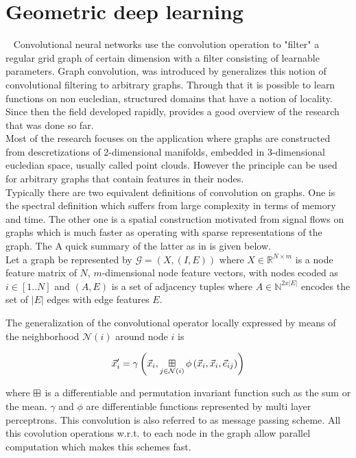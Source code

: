 \section{Geometric deep learning}~\label{sec:gcn}
Convolutional neural networks use the convolution operation to "filter" a regular grid graph of certain dimension with a filter consisting of learnable parameters. Graph convolution, was introduced by \cite{bruna2013spectral} generalizes this notion of convolutional filtering to arbitrary graphs. Through that it is possible to learn functions on non eucledian, structured domains that have a notion of locality.\\
Since then the field developed rapidly, \cite{Bronstein_2017} provides a good overview of the research that was done so far.\\
Most of the research focuses on the application where graphs are constructed from descretizations of 2-dimensional manifolds, embedded in 3-dimensional eucledian space, usually called point clouds. However the principle can be used for arbitrary graphs that contain features in their nodes.\\
Typically there are two equivalent definitions of convolution on graphs. One is the spectral definition which suffers from large complexity in terms of memory and time. The other one is a spatial construction motivated from signal flows on graphs which is much faster as operating with sparse representations of the graph. The A quick summary of the latter as in \cite{gilmer2017neural} is given below. \\

Let a graph be represented by $\mathcal{G}=(X, (I, E))$ where $X\in \mathbb{R}^{N\times m}$ is a node feature matrix of $N$, $m$-dimensional node feature vectors, with nodes ecoded as $i \in[1..N]$ and $(A, E)$ is a set of adjacency tuples where $A\in \mathbb{N}^{2x|E|}$ encodes the set of $|E|$ edges with edge features $E$.

The generalization of the convolutional operator locally expressed by means of the neighborhood $\mathcal{N}(i)$ around node $i$ is

\begin{align}
	\vec{x}_i^\prime = \gamma \left(\vec{x}_i, \operatorname*{\boxplus}_{j \in \mathcal{N}(i)}  \phi \left(\vec{x}_i, \vec{x}_i, \vec{e}_{ij} \right) \right)
\end{align}

where $\operatorname*{\boxplus}$ is a differentiable and permutation invariant function such as the sum or the mean. $\gamma$ and $\phi$ are differentiable functions represented by multi layer perceptrons. This convolution is also referred to as message passing scheme. All this covolution operations w.r.t. to each node in the graph allow parallel computation which makes this schemes fast.



